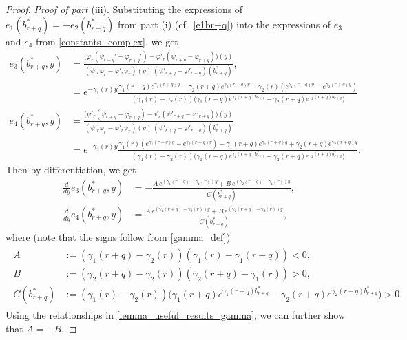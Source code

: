 \documentclass[11pt]{article} %
\renewcommand{\phi}{\varphi}
\numberwithin{komcounter}{section}
\numberwithin{equation}{section}
\numberwithin{theorem}{section}
\begin{document}
\begin{proof}
\vspace{1mm} 
{\it Proof of part} (iii). 
Substituting the expressions of $e_1(b^*_{r+q}) = - e_2(b^*_{r+q})$ from part (i) (cf.~\eqref{e1br+q}) into the expressions of $e_3$ and $e_4$ from \eqref{constants_complex}, we get 
\begin{align*}
e_3(b^*_{r+q},y) 
&= \frac{\big(\phi_r(\psi_{r+q}'-\phi_{r+q}')-\phi'_r(\psi_{r+q}-\phi_{r+q})\big)(y)}{(\psi'_r\phi_r-\phi'_r\psi_r)(y) \, (\psi'_{r+q}-\phi'_{r+q})(b^*_{r+q})},\\
&=e^{-\gamma_1(r)y} \frac{\gamma_1(r+q)e^{\gamma_1(r+q)y}-\gamma_2(r+q)e^{\gamma_2(r+q)y}-\gamma_2(r)\left(e^{\gamma_1(r+q)y}-e^{\gamma_2(r+q)y}\right)}{(\gamma_1(r)-\gamma_2(r)) \big(\gamma_1(r+q) e^{\gamma_1(r+q)b^*_{r+q}} - \gamma_2(r+q) e^{\gamma_2(r+q)b^*_{r+q}} \big)}\\
e_4(b^*_{r+q},y) 
&= \frac{\big(\psi'_r(\psi_{r+q}-\phi_{r+q}) - \psi_r(\psi'_{r+q}-\phi'_{r+q})\big)(y)}{(\psi'_r\phi_r-\phi'_r\psi_r)(y) \, (\psi'_{r+q}-\phi'_{r+q})(b^*_{r+q})}\\ 
&= e^{-\gamma_2(r)y} \frac{\gamma_1(r)\left(e^{\gamma_1(r+q)y}-e^{\gamma_2(r+q)y}\right) - \gamma_1(r+q) e^{\gamma_1(r+q)y} + \gamma_2(r+q)e^{\gamma_2(r+q)y}}{(\gamma_1(r)-\gamma_2(r)) \big(\gamma_1(r+q) e^{\gamma_1(r+q)b^*_{r+q}} - \gamma_2(r+q) e^{\gamma_2(r+q)b^*_{r+q}}\big)}.
\end{align*}
Then by differentiation, we get 
\begin{align*}
\frac{d}{dy} e_3(b^*_{r+q},y) 
&= -\frac{A \, e^{(\gamma_1(r+q)-\gamma_1(r))y} + B \, e^{(\gamma_2(r+q)-\gamma_1(r))y}}{C(b^*_{r+q})}, \\
\frac{d}{dy} e_4(b^*_{r+q},y) 
&= \frac{A \, e^{(\gamma_1(r+q)-\gamma_2(r))y} + B \, e^{(\gamma_2(r+q)-\gamma_2(r))y}}{C(b^*_{r+q})},
\end{align*}
where (note that the signs follow from \eqref{gamma_def})
\begin{align}\label{AB_defmidy}
\begin{split}
A &:= (\gamma_1(r+q)-\gamma_2(r))(\gamma_1(r)-\gamma_1(r+q)) < 0 ,\\ 
B &:= (\gamma_2(r+q)-\gamma_2(r))(\gamma_2(r+q)-\gamma_1(r)) > 0 ,\\
C(b^*_{r+q}) &:= (\gamma_1(r)-\gamma_2(r)) \big(\gamma_1(r+q) e^{\gamma_1(r+q)b^*_{r+q}} - \gamma_2(r+q) e^{\gamma_2(r+q)b^*_{r+q}} \big) > 0 .
\end{split}
\end{align}
Using the relationships in \eqref{lemma_useful_results_gamma}, we can further show that $A = -B$,

\end{proof}
\end{document}
